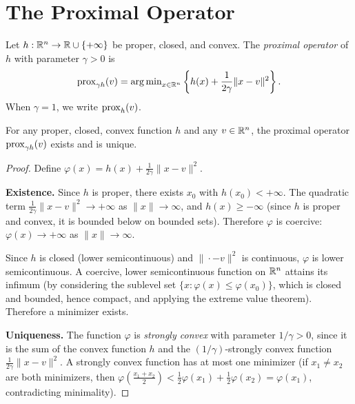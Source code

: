 \documentclass[11pt,a4paper]{article}
\begin{document}

\section{The Proximal Operator}\label{sec:proximal-op}

\begin{definition}\label{def:prox}
Let $h : \mathbb{R}^n \to \mathbb{R} \cup \{+\infty\}$ be proper, closed, and convex.
The \emph{proximal operator} of $h$ with parameter $\gamma > 0$ is
\begin{equation}\label{eq:prox}
  \operatorname{prox}_{\gamma h}(v) = \operatorname{arg\,min}_{x \in \mathbb{R}^n}
  \left\{h(x) + \frac{1}{2\gamma}\|x - v\|^2\right\}.
\end{equation}
When $\gamma = 1$, we write $\operatorname{prox}_h(v)$.
\end{definition}

\begin{proposition}%
\label{prop:prox-well-defined}
For any proper, closed, convex function $h$ and any $v \in \mathbb{R}^n$, the
proximal operator $\operatorname{prox}_{\gamma h}(v)$ exists and is unique.
\end{proposition}

\begin{proof}
Define $\varphi(x) = h(x) + \frac{1}{2\gamma}\|x - v\|^2$.

\textbf{Existence.}
Since $h$ is proper, there exists $x_0$ with $h(x_0) < +\infty$.
The quadratic term $\frac{1}{2\gamma}\|x - v\|^2 \to +\infty$ as
$\|x\| \to \infty$, and $h(x) \ge -\infty$ (since $h$ is proper and
convex, it is bounded below on bounded sets). Therefore $\varphi$ is
coercive: $\varphi(x) \to +\infty$ as $\|x\| \to \infty$.

Since $h$ is closed (lower semicontinuous) and $\|\cdot - v\|^2$ is
continuous, $\varphi$ is lower semicontinuous. A coercive, lower
semicontinuous function on $\mathbb{R}^n$ attains its infimum (by considering
the sublevel set $\{x : \varphi(x) \le \varphi(x_0)\}$, which is
closed and bounded, hence compact, and applying the extreme value
theorem). Therefore a minimizer exists.

\textbf{Uniqueness.}
The function $\varphi$ is \emph{strongly convex} with parameter
$1/\gamma > 0$, since it is the sum of the convex function $h$ and
the $(1/\gamma)$-strongly convex function
$\frac{1}{2\gamma}\|x - v\|^2$. A strongly convex function has at
most one minimizer (if $x_1 \ne x_2$ are both minimizers, then
$\varphi(\frac{x_1+x_2}{2}) < \frac{1}{2}\varphi(x_1)
+ \frac{1}{2}\varphi(x_2) = \varphi(x_1)$, contradicting minimality).
\end{proof}
\end{document}

